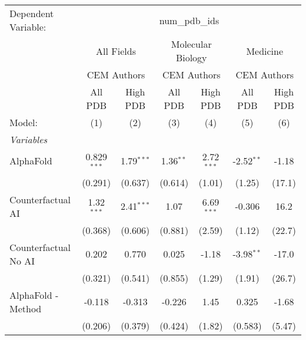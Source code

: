\begingroup
\centering
\begin{tabular}{lcccccc}
   \tabularnewline \midrule \midrule
   Dependent Variable: & \multicolumn{6}{c}{num\_pdb\_ids}\\
 & \multicolumn{2}{c}{All Fields} & \multicolumn{2}{c}{Molecular Biology} & \multicolumn{2}{c}{Medicine} \\
\cmidrule(lr){2-3} \cmidrule(lr){4-5} \cmidrule(lr){6-7}
 & \multicolumn{2}{c}{CEM Authors} & \multicolumn{2}{c}{CEM Authors} & \multicolumn{2}{c}{CEM Authors} \\
\cmidrule(lr){2-3} \cmidrule(lr){4-5} \cmidrule(lr){6-7}
 & \multicolumn{1}{c}{All PDB} & \multicolumn{1}{c}{High PDB} & \multicolumn{1}{c}{All PDB} & \multicolumn{1}{c}{High PDB} & \multicolumn{1}{c}{All PDB} & \multicolumn{1}{c}{High PDB} \\
\cmidrule(lr){2-2} \cmidrule(lr){3-3} \cmidrule(lr){4-4} \cmidrule(lr){5-5} \cmidrule(lr){6-6} \cmidrule(lr){7-7}
   Model:                                                     & (1)           & (2)           & (3)          & (4)          & (5)           & (6)\\  
   \midrule
   \emph{Variables}\\
   AlphaFold                                                  & 0.829$^{***}$ & 1.79$^{***}$  & 1.36$^{**}$  & 2.72$^{***}$ & -2.52$^{**}$  & -1.18\\   
                                                              & (0.291)       & (0.637)       & (0.614)      & (1.01)       & (1.25)        & (17.1)\\   
   Counterfactual AI                                          & 1.32$^{***}$  & 2.41$^{***}$  & 1.07         & 6.69$^{***}$ & -0.306        & 16.2\\   
                                                              & (0.368)       & (0.606)       & (0.881)      & (2.59)       & (1.12)        & (22.7)\\   
   Counterfactual No AI                                       & 0.202         & 0.770         & 0.025        & -1.18        & -3.98$^{**}$  & -17.0\\   
                                                              & (0.321)       & (0.541)       & (0.855)      & (1.29)       & (1.91)        & (26.7)\\   
   AlphaFold - Method                                         & -0.118        & -0.313        & -0.226       & 1.45         & 0.325         & -1.68\\   
                                                              & (0.206)       & (0.379)       & (0.424)      & (1.82)       & (0.583)       & (5.47)\\   

\end{tabular}

